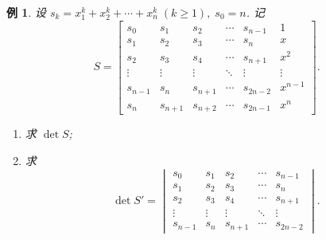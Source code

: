 \documentclass[10pt,openany]{article}
\theoremstyle{thmstyle} %
\theoremstyle{defstyle} %
\theoremstyle{prostyle} %
\theoremstyle{exastyle}
\newtheorem{example}[theorem]{例}
\theoremstyle{remstyle}
\begin{document}
\begin{example}
	设 \( s_k = x_1^k + x_2^k + \cdots + x_n^k \; (k \geq 1), \; s_0 = n \). 记
	\[
	S =
	\begin{bmatrix}
		s_0 & s_1 & s_2 & \cdots & s_{n-1} & 1 \\
		s_1 & s_2 & s_3 & \cdots & s_n& x \\
		s_2 & s_3 & s_4 & \cdots & s_{n+1} & x^2 \\
		\vdots & \vdots & \vdots & \ddots & \vdots & \vdots \\
		s_{n-1} & s_n & s_{n+1} & \cdots & s_{2n-2} & x^{n-1} \\
		s_{n} & s_{n+1} & s_{n+2} & \cdots & s_{2n-1} & x^n
	\end{bmatrix}.
	\]
	
    \begin{enumerate}[(1)]
    	\item 求 \( \det S \);
    	\item 求
    	\[ \det S'= \begin{vmatrix}
    		s_0 & s_1 & s_2 & \cdots & s_{n-1}  \\
    		s_1 & s_2 & s_3 & \cdots & s_n\\
    		s_2 & s_3 & s_4 & \cdots & s_{n+1}  \\
    		\vdots & \vdots & \vdots & \ddots & \vdots \\
    		s_{n-1} & s_n & s_{n+1} & \cdots & s_{2n-2}
    	\end{vmatrix}. \]
    \end{enumerate}
\end{example}
\end{document}
